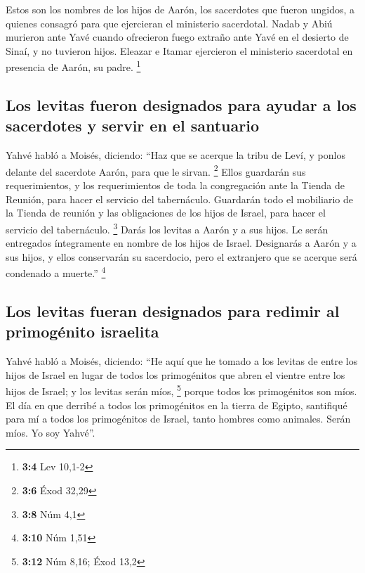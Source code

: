 Estos son los nombres de los hijos de Aarón, los
sacerdotes que fueron ungidos, a quienes consagró para que ejercieran el
ministerio sacerdotal.  Nadab y Abiú murieron ante Yavé
cuando ofrecieron fuego extraño ante Yavé en el desierto de Sinaí, y no
tuvieron hijos. Eleazar e Itamar ejercieron el ministerio sacerdotal en
presencia de Aarón, su padre. \footnote{\textbf{3:4} Lev 10,1-2}

\hypertarget{los-levitas-fueron-designados-para-ayudar-a-los-sacerdotes-y-servir-en-el-santuario}{%
\subsection{Los levitas fueron designados para ayudar a los sacerdotes y
servir en el
santuario}\label{los-levitas-fueron-designados-para-ayudar-a-los-sacerdotes-y-servir-en-el-santuario}}

 Yahvé habló a Moisés, diciendo:  ``Haz que
se acerque la tribu de Leví, y ponlos delante del sacerdote Aarón, para
que le sirvan. \footnote{\textbf{3:6} Éxod 32,29}  Ellos
guardarán sus requerimientos, y los requerimientos de toda la
congregación ante la Tienda de Reunión, para hacer el servicio del
tabernáculo.  Guardarán todo el mobiliario de la Tienda de
reunión y las obligaciones de los hijos de Israel, para hacer el
servicio del tabernáculo. \footnote{\textbf{3:8} Núm 4,1} 
Darás los levitas a Aarón y a sus hijos. Le serán entregados
íntegramente en nombre de los hijos de Israel. 
Designarás a Aarón y a sus hijos, y ellos conservarán su sacerdocio,
pero el extranjero que se acerque será condenado a muerte.'' \footnote{\textbf{3:10}
  Núm 1,51}

\hypertarget{los-levitas-fueran-designados-para-redimir-al-primoguxe9nito-israelita}{%
\subsection{Los levitas fueran designados para redimir al primogénito
israelita}\label{los-levitas-fueran-designados-para-redimir-al-primoguxe9nito-israelita}}

 Yahvé habló a Moisés, diciendo:  ``He
aquí que he tomado a los levitas de entre los hijos de Israel en lugar
de todos los primogénitos que abren el vientre entre los hijos de
Israel; y los levitas serán míos, \footnote{\textbf{3:12} Núm 8,16; Éxod
  13,2}  porque todos los primogénitos son míos. El día
en que derribé a todos los primogénitos en la tierra de Egipto,
santifiqué para mí a todos los primogénitos de Israel, tanto hombres
como animales. Serán míos. Yo soy Yahvé''.

